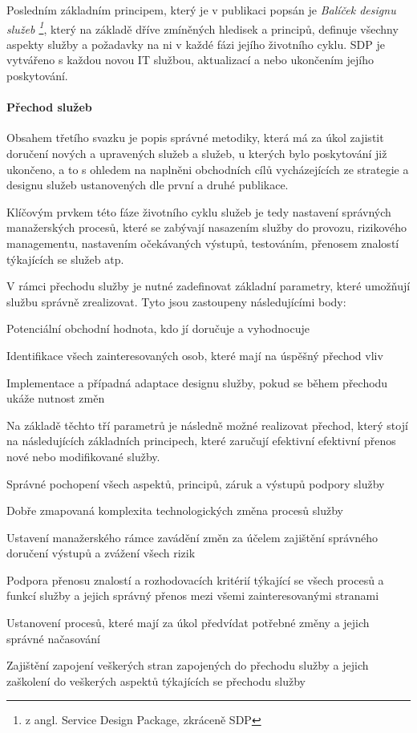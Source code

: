 \documentclass[
  digital,     %
  twoside,     %
  lof,         %
  lot,         %
]{fithesis4}
\begin{document}
Posledním základním principem, který je v publikaci popsán je  \emph{Balíček designu služeb \footnote{z angl. Service Design Package, zkráceně SDP}}, který na základě dříve zmíněných hledisek a principů, definuje všechny aspekty služby a požadavky na ni v každé fázi jejího životního cyklu. SDP je vytvářeno s každou novou IT službou, aktualizací a nebo ukončením jejího poskytování.\parencite[s.~23]{Carlidge2007}
\paragraph{Přechod služeb}
Obsahem třetího svazku je popis správné metodiky, která má za úkol zajistit doručení nových a upravených služeb a služeb, u kterých bylo poskytování již ukončeno, a to s ohledem na naplněni obchodních cílů vycházejících ze strategie a designu služeb ustanovených dle první a druhé publikace.\parencite[s.~30]{Carlidge2007}

Klíčovým prvkem této fáze životního cyklu služeb je tedy nastavení správných manažerských procesů, které se zabývají nasazením služby do provozu, rizikového managementu, nastavením očekávaných výstupů, testováním, přenosem znalostí týkajících se služeb atp.\parencite[s.~30]{Carlidge2007}

V rámci přechodu služby je nutné zadefinovat základní parametry, které umožňují službu správně zrealizovat. Tyto jsou zastoupeny následujícími body:\parencite[s.~30]{Carlidge2007}
\begin{compactitem}
    \item Potenciální obchodní hodnota, kdo jí doručuje a vyhodnocuje
    \item Identifikace všech zainteresovaných osob, které mají na úspěšný přechod vliv
    \item Implementace a případná adaptace designu služby, pokud se během přechodu ukáže nutnost změn
\end{compactitem}

Na základě těchto tří parametrů je následně možné realizovat přechod, který stojí na následujících základních principech, které zaručují efektivní efektivní přenos nové nebo modifikované služby. \parencite[s.~30]{Carlidge2007}
\begin{compactitem}
    \item Správné pochopení všech aspektů, principů, záruk a výstupů podpory služby
    \item Dobře zmapovaná komplexita technologických změna  procesů služby
    \item Ustavení manažerského rámce zavádění změn za účelem zajištění správného doručení výstupů a zvážení všech rizik
    \item Podpora přenosu znalostí a rozhodovacích kritérií týkající se všech procesů a funkcí služby a jejich správný přenos mezi všemi zainteresovanými stranami
    \item Ustanovení procesů, které mají za úkol předvídat potřebné změny a jejich správné načasování
    \item Zajištění zapojení veškerých stran zapojených do přechodu služby a jejich zaškolení do veškerých aspektů týkajících se přechodu služby
\end{compactitem}
\end{document}

